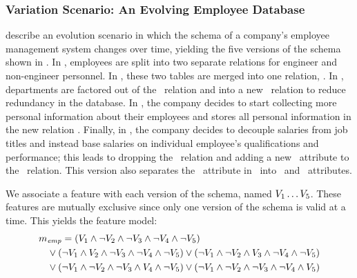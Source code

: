\subsubsection{Variation Scenario: An Evolving Employee Database}
\label{sec:emp-scenario}



\citet{prima08Moon} describe an evolution scenario in which the schema of a
company's employee management system changes over time, yielding the five
versions of the schema shown in .
%
In \vOne, employees are split into two separate relations for
engineer and non-engineer personnel.
%
In \vTwo, these two tables are merged into one relation, \empacct.
%
In \vThree, departments are factored out of the \empacct\ relation and
into a new \dept\ relation to reduce redundancy in the database.
%
In \vFour, the company decides to start collecting more personal
information about their employees and stores all personal information in the
new relation \empbio.
%
Finally, in \vFive, the company decides to decouple salaries from
job titles and instead base salaries on individual employee's qualifications
and performance; this leads to dropping the \job\ relation and adding a new
\salary\ attribute to the \empacct\ relation. This version also separates the
\name\ attribute in \empbio\ into \fname\ and \lname\ attributes.


We associate a feature with each version of the schema, named 
$\vOne\ldots\vFive$.
%
These features are mutually exclusive since only one version of the
schema is valid at a time. This yields the  feature model:
%
%
\begin{align*}
\fModel_\employee
  &=   \left(\vOne\wedge\neg\vTwo\wedge\neg\vThree\wedge\neg\vFour\wedge\neg\vFive\right)\\
  &\hspace{-15pt} \vee\left(\neg\vOne\wedge\vTwo\wedge\neg\vThree\wedge\neg\vFour\wedge\neg\vFive\right)
  \vee\left(\neg\vOne\wedge\neg\vTwo\wedge\vThree\wedge\neg\vFour\wedge\neg\vFive\right)\\
   &\hspace{-15pt} \vee\left(\neg\vOne\wedge\neg\vTwo\wedge\neg\vThree\wedge\vFour\wedge\neg\vFive\right)
  \vee\left(\neg\vOne\wedge\neg\vTwo\wedge\neg\vThree\wedge\neg\vFour\wedge\vFive\right)
\end{align*}

